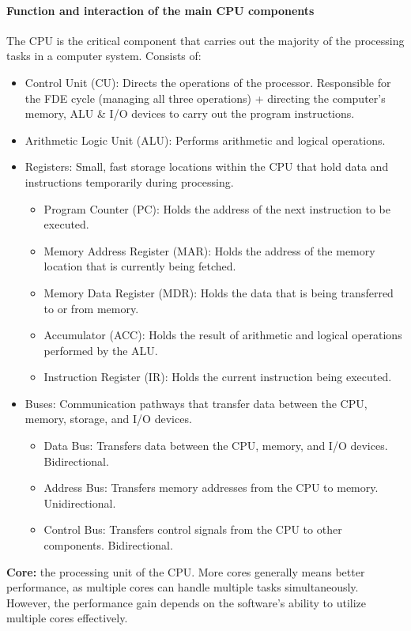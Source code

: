 \documentclass[a4paper,12pt]{article}
\begin{document}
\paragraph{Function and interaction of the main CPU components}
The CPU is the critical component that carries out the majority of the processing tasks in a computer system. Consists of:
\begin{itemize}
    \item Control Unit (CU): Directs the operations of the processor. Responsible for the FDE cycle (managing all three operations) + directing the computer's memory, ALU \& I/O devices to carry out the program instructions.
    \item Arithmetic Logic Unit (ALU): Performs arithmetic and logical operations.
    \item Registers: Small, fast storage locations within the CPU that hold data and instructions temporarily during processing.
    \begin{itemize}
        \item Program Counter (PC): Holds the address of the next instruction to be executed.
        \item Memory Address Register (MAR): Holds the address of the memory location that is currently being fetched.
        \item Memory Data Register (MDR): Holds the data that is being transferred to or from memory.
        \item Accumulator (ACC): Holds the result of arithmetic and logical operations performed by the ALU.
        \item Instruction Register (IR): Holds the current instruction being executed.
    \end{itemize}
    \item Buses: Communication pathways that transfer data between the CPU, memory, storage, and I/O devices.
    \begin{itemize}
        \item Data Bus: Transfers data between the CPU, memory, and I/O devices. Bidirectional.
        \item Address Bus: Transfers memory addresses from the CPU to memory. Unidirectional.
        \item Control Bus: Transfers control signals from the CPU to other components. Bidirectional.
    \end{itemize}
\end{itemize}
\textbf{Core:} the processing unit of the CPU. More cores generally means better performance, as multiple cores can handle multiple tasks simultaneously. However, the performance gain depends on the software's ability to utilize multiple cores effectively.\\
\end{document}
